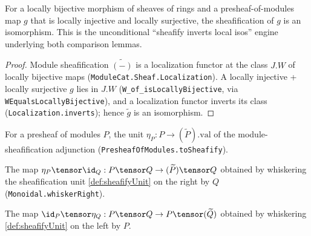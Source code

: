 \begin{lemma}
  \label{lem:sheafification_map_isIso}
  For a locally bijective morphism of sheaves of rings and a presheaf-of-modules
  map $g$ that is locally injective and locally surjective, the sheafification of
  $g$ is an isomorphism. This is the unconditional ``sheafify inverts local isos''
  engine underlying both comparison lemmas.
  \begin{proof}
    Module sheafification $\widetilde{(-)}$ is a localization functor at the class
    $J.W$ of locally bijective maps (\texttt{ModuleCat.Sheaf.Localization}). A
    locally injective + locally surjective $g$ lies in $J.W$
    (\texttt{W\_of\_isLocallyBijective}, via \texttt{WEqualsLocallyBijective}), and a
    localization functor inverts its class (\texttt{Localization.inverts}); hence
    $\widetilde{g}$ is an isomorphism.
  \end{proof}
\end{lemma}

\begin{definition}
  \label{def:sheafifyUnit}
  For a presheaf of modules $P$, the unit $\eta_P : P \to (\widetilde{P}).\mathrm{val}$
  of the module-sheafification adjunction (\texttt{PresheafOfModules.toSheafify}).
\end{definition}

\begin{definition}
  \label{def:sheafifyTensorUnitWhiskerRight}
  The map $\eta_P \tensor \id_Q : P \tensor Q \to (\widetilde{P}) \tensor Q$
  obtained by whiskering the sheafification unit \cref{def:sheafifyUnit} on the
  right by $Q$ (\texttt{Monoidal.whiskerRight}).
\end{definition}

\begin{definition}
  \label{def:sheafifyTensorUnitWhiskerLeft}
  The map $\id_P \tensor \eta_Q : P \tensor Q \to P \tensor (\widetilde{Q})$
  obtained by whiskering \cref{def:sheafifyUnit} on the left by $P$.
\end{definition}

